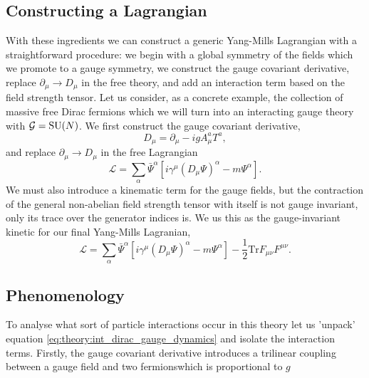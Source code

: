 \subsection{Constructing a Lagrangian}
With these ingredients we can construct a generic Yang-Mills Lagrangian with a straightforward procedure: we begin with a global symmetry of the fields which we promote to a gauge symmetry, we construct the gauge covariant derivative, replace $\partial_{\mu} \rightarrow D_{\mu}$ in the free theory, and add an interaction term based on the field strength tensor. 
Let us consider, as a concrete example, the collection of massive free Dirac fermions which we will turn into an interacting gauge theory with $\mathcal{G} = {\mathrm{SU}(N)}$.
We first construct the gauge covariant derivative, 
\begin{equation}
    \label{eq:theory:generic_SUN_Dmu}
    D_{\mu} = \partial_{\mu} - igA_{\mu}^{a} T^{a},
\end{equation}
and replace $\partial_{\mu} \rightarrow D_{\mu}$ in the free Lagrangian
\begin{equation}
    \label{eq:theory:int_dirac_no_gauge_dynamics}
    \mathcal{L} = \sum_{\alpha} \bar{\Psi}^{\alpha}[i\gamma^{\mu}(D_{\mu}\Psi)^{\alpha} - m\Psi^{\alpha}].
\end{equation}
We must also introduce a kinematic term for the gauge fields, but the contraction of the general non-abelian field strength tensor with itself is not gauge invariant, only its trace over the generator indices is. 
We us this as the gauge-invariant kinetic for our final Yang-Mills Lagranian,
\begin{equation}
    \label{eq:theory:int_dirac_gauge_dynamics}
    \mathcal{L} = \sum_{\alpha} \bar{\Psi}^{\alpha}[i\gamma^{\mu}(D_{\mu}\Psi)^{\alpha} - m\Psi^{\alpha}] - \frac{1}{2}\mathrm{Tr}F_{\mu\nu}F^{\mu\nu}.
\end{equation}











\subsection{Phenomenology}
To analyse what sort of particle interactions occur in this theory let us 'unpack' equation \ref{eq:theory:int_dirac_gauge_dynamics} and isolate the interaction terms.
Firstly, the gauge covariant derivative introduces a trilinear coupling between a gauge field and two fermionswhich is proportional to $g$


